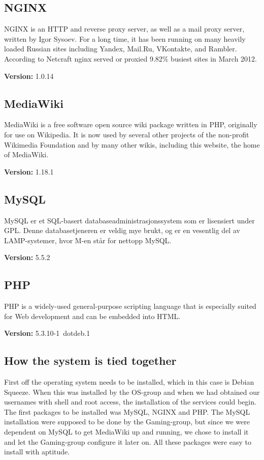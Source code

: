 \subsection{NGINX}
NGINX is an HTTP and reverse proxy server, as well as a mail proxy server, written by Igor Sysoev. For a long time, it has been running on many heavily loaded Russian sites including Yandex, Mail.Ru, VKontakte, and Rambler. According to Netcraft nginx served or proxied 9.82\% busiest sites in March 2012.\cite{nginx}
\begin{description}
\item{\textbf{Version: }}1.0.14
\end{description}
\subsection{MediaWiki}
MediaWiki is a free software open source wiki package written in PHP, originally for use on Wikipedia. It is now used by several other projects of the non-profit Wikimedia Foundation and by many other wikis, including this website, the home of MediaWiki.\cite{mediawiki}
\begin{description}
\item{\textbf{Version: }}1.18.1
\end{description}
\subsection{MySQL}
MySQL er et SQL-basert databaseadministrasjonssystem som er lisensiert under GPL. Denne databasetjeneren er veldig mye brukt, og er en vesentlig del av LAMP-systemer, hvor M-en står for nettopp MySQL.\cite{mysql}
\begin{description}
\item{\textbf{Version: }}5.5.2
\end{description}
\subsection{PHP}
PHP is a widely-used general-purpose scripting language that is especially suited for Web development and can be embedded into HTML.\cite{php}
\begin{description}
\item{\textbf{Version: }}5.3.10-1~dotdeb.1
\end{description}
\subsection{How the system is tied together}
First off the operating system needs to be installed, which in this case is Debian Squeeze. When this was installed by the OS-group and when we had obtained our usernames with shell and root access, the installation of the services could begin. The first packages to be installed was MySQL, NGINX and PHP. The MySQL installation were supposed to be done by the Gaming-group, but since we were dependent on MySQL to get MediaWiki up and running, we chose to install it and let the Gaming-group configure it later on. All these packages were easy to install with aptitude.

